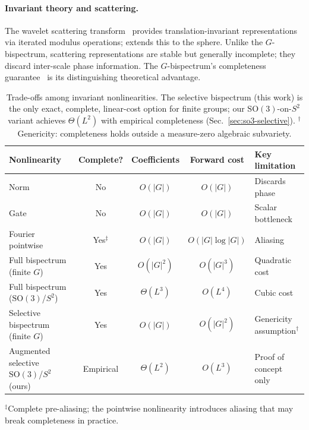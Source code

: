 \documentclass{article}
\theoremstyle{definition}
\theoremstyle{remark}
\newcommand{\SO}{\mathrm{SO}}
\theoremstyle{definition}
\begin{document}
\paragraph{Invariant theory and scattering.}
The wavelet scattering transform~\citep{mallat2012scattering} provides
translation-invariant representations via iterated modulus operations;
\citet{esteves2018spherical} extends this to the sphere. Unlike the
$G$-bispectrum, scattering representations are stable but generally
incomplete; they discard inter-scale phase information.
The $G$-bispectrum's completeness
guarantee~\citep{giannakis1989bispectrum, kakarala2012bispectrum} is
its distinguishing theoretical advantage.

\begin{table}[t]
  \caption{Trade-offs among invariant nonlinearities. The selective
    bispectrum (this work) is the only exact, complete, linear-cost
    option for finite groups; our $\SO(3)$-on-$S^2$ variant achieves
    $\Theta(L^2)$ with empirical completeness
    (Sec.~\ref{sec:so3-selective}).
    $^\dagger$Genericity: completeness holds outside a measure-zero
    algebraic subvariety.}
  \label{tab:nonlinearity-comparison}
  \centering
  \small
  \setlength{\tabcolsep}{4pt}
  \begin{tabular}{lcccl}
    \toprule
    Nonlinearity & Complete? & Coefficients & Forward cost & Key limitation \\
    \midrule
    Norm              & No              & $O(|G|)$   & $O(|G|)$          & Discards phase \\
    Gate              & No              & $O(|G|)$   & $O(|G|)$          & Scalar bottleneck \\
    Fourier pointwise & Yes$^\ddagger$  & $O(|G|)$   & $O(|G| \log |G|)$ & Aliasing \\
    Full bispectrum (finite $G$)      & Yes & $O(|G|^2)$   & $O(|G|^3)$ & Quadratic cost \\
    Full bispectrum ($\SO(3)$/$S^2$)  & Yes & $\Theta(L^3)$ & $O(L^4)$  & Cubic cost \\
    \midrule
    Selective bispectrum (finite $G$) & Yes       & $O(|G|)$      & $O(|G|^2)$ & Genericity assumption$^\dagger$ \\
    Augmented selective $\SO(3)$/$S^2$ (ours) & Empirical & $\Theta(L^2)$ & $O(L^3)$   & Proof of concept only \\
    \bottomrule
  \end{tabular}

  \vspace{0.3em}
  {\small $^\ddagger$Complete pre-aliasing; the pointwise nonlinearity introduces aliasing that may break completeness in practice.}
\end{table}
\end{document}
